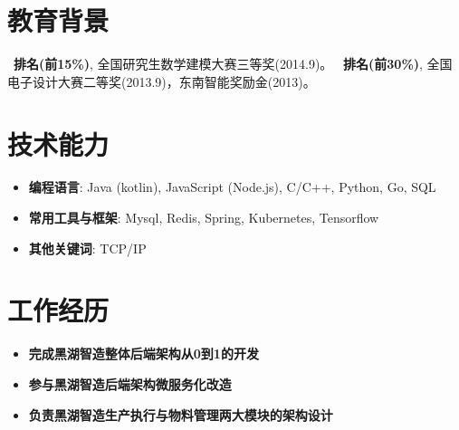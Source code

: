 \documentclass{resume}
\begin{document}



\section{教育背景}
\ \textbf{排名(前15\%)}, 全国研究生数学建模大赛三等奖(2014.9)。
\ \textbf{排名(前30\%)}, 全国电子设计大赛二等奖(2013.9)，东南智能奖励金(2013)。

\section{技术能力}
\begin{itemize}[parsep=0.2ex]
  \item \textbf{编程语言}: Java (kotlin), JavaScript (Node.js), C/C++, Python, Go, SQL
  \item \textbf{常用工具与框架}: Mysql, Redis, Spring, Kubernetes, Tensorflow
  \item \textbf{其他关键词}: TCP/IP
\end{itemize}


\section{工作经历}
\begin{itemize}
  \item \textbf{完成黑湖智造整体后端架构从0到1的开发}
  \item \textbf{参与黑湖智造后端架构微服务化改造}
  \item \textbf{负责黑湖智造生产执行与物料管理两大模块的架构设计}
\end{itemize}
\end{document}
